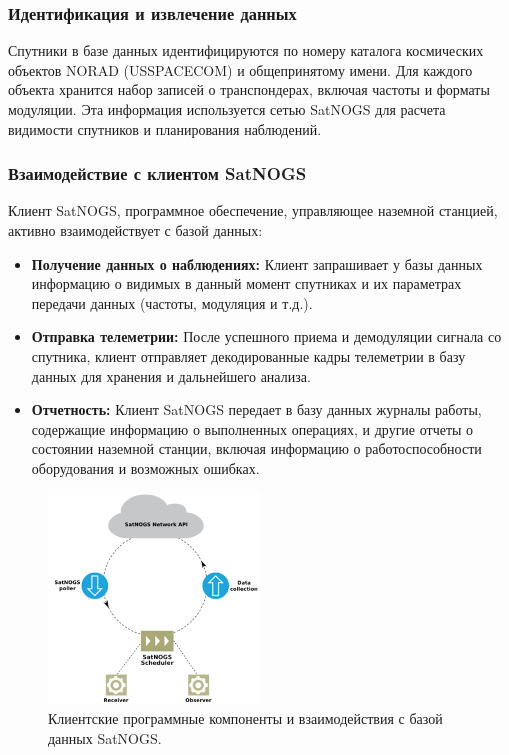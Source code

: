 \documentclass[14pt, a4paper]{extreport}
\begin{document}
    \subsubsection{Идентификация и извлечение данных}

    Спутники в базе данных идентифицируются по номеру каталога космических объектов NORAD (USSPACECOM) и общепринятому имени.
    Для каждого объекта хранится набор записей о транспондерах, включая частоты и форматы модуляции.
    Эта информация используется сетью SatNOGS для расчета видимости спутников и планирования наблюдений.

    \subsubsection{Взаимодействие с клиентом SatNOGS}

    Клиент SatNOGS, программное обеспечение, управляющее наземной станцией, активно взаимодействует с базой данных:

    \begin{itemize}
        \item \textbf{Получение данных о наблюдениях:} Клиент запрашивает у базы данных информацию о видимых в данный момент спутниках и их параметрах передачи данных (частоты, модуляция и т.д.).
        \item \textbf{Отправка телеметрии:} После успешного приема и демодуляции сигнала со спутника, клиент отправляет декодированные кадры телеметрии в базу данных для хранения и дальнейшего анализа.
        \item \textbf{Отчетность:} Клиент SatNOGS передает в базу данных журналы работы, содержащие информацию о выполненных операциях,  и другие отчеты о состоянии наземной станции, включая информацию о работоспособности оборудования и возможных ошибках.
    \end{itemize}

    \begin{figure}[h!]
        \centering
        \includegraphics[width=0.5\textwidth]{satnogs_client_program_interactions}
        \caption{Клиентские программные компоненты и взаимодействия с базой данных SatNOGS.}
        \label{fig:satnogs_client_program_interactions}
    \end{figure}
\end{document}
